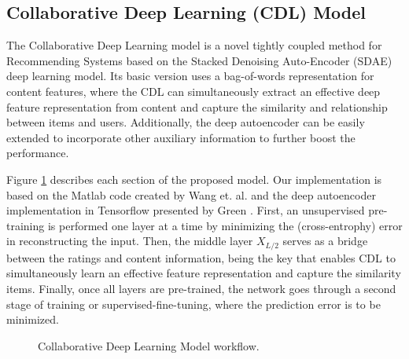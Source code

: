 \documentclass{article} %
\begin{document}
\subsection{Collaborative Deep Learning (CDL) Model}

The Collaborative Deep Learning model is a novel tightly coupled method for Recommending Systems based on the Stacked Denoising Auto-Encoder (SDAE) deep learning model. Its basic version uses a bag-of-words representation for content features, where the CDL can simultaneously extract an effective deep feature representation from content and capture the similarity and relationship between items and users. Additionally, the deep autoencoder can be easily extended to incorporate other auxiliary information to further boost the performance.

Figure \ref{fig:cdlworkflow} describes each section of the proposed model. Our implementation is based on the Matlab code created by Wang et. al. \cite{wang2015collaborative} and the deep autoencoder implementation in Tensorflow presented by Green \cite{christofergreen2016}. First, an unsupervised pre-training is performed one layer at a time by minimizing the (cross-entrophy) error in reconstructing the input. Then, the middle layer $X_{L/2}$ serves as a bridge between the ratings and content information, being the key that enables CDL to simultaneously learn an effective feature representation and capture the similarity items. Finally, once all layers are pre-trained, the network goes through a second stage of training or supervised-fine-tuning, where the prediction error is to be minimized. 

\begin{figure}[!htbp]
\begin{center}
\end{center}
\caption{Collaborative Deep Learning Model workflow.}
\label{fig:cdlworkflow}
\end{figure}
\end{document}
